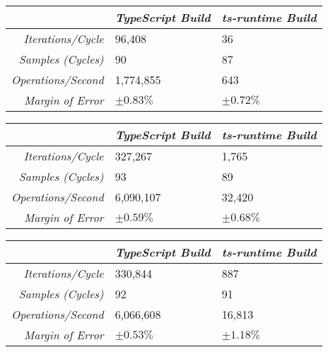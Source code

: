 \begin{center}
{
\centering
\tabulinesep=1.2mm
\setlength{\tabcolsep}{5mm}
\def\arraystretch{1.25}
\small
\begin{tabu} to \textwidth {|r||X[c,m]|X[c,m]|}
  \hline
  & \emph{TypeScript Build} & \emph{ts-runtime Build} \\
  \hline
  \hline
  \emph{Iterations/Cycle}  & 96,408 & 36 \\
  \hline
  \emph{Samples (Cycles)}  & 90 & 87 \\
  \hline
  \emph{Operations/Second} & 1,774,855 & 643 \\
  \hline
  \emph{Margin of Error}   & $\pm 0.83\%$ & $\pm 0.72\%$ \\
  \hline
\end{tabu}
}
\end{center}

\begin{center}
{
\centering
\tabulinesep=1.2mm
\setlength{\tabcolsep}{5mm}
\def\arraystretch{1.25}
\small
\begin{tabu} to \textwidth {|r||X[c,m]|X[c,m]|}
  \hline
  & \emph{TypeScript Build} & \emph{ts-runtime Build} \\
  \hline
  \hline
  \emph{Iterations/Cycle}  & 327,267 & 1,765 \\
  \hline
  \emph{Samples (Cycles)}  & 93 & 89 \\
  \hline
  \emph{Operations/Second} & 6,090,107 & 32,420 \\
  \hline
  \emph{Margin of Error}   & $\pm 0.59\%$ & $\pm 0.68\%$ \\
  \hline
\end{tabu}
}
\end{center}

\begin{center}
{
\centering
\tabulinesep=1.2mm
\setlength{\tabcolsep}{5mm}
\def\arraystretch{1.25}
\small
\begin{tabu} to \textwidth {|r||X[c,m]|X[c,m]|}
  \hline
  & \emph{TypeScript Build} & \emph{ts-runtime Build} \\
  \hline
  \hline
  \emph{Iterations/Cycle}  & 330,844 & 887 \\
  \hline
  \emph{Samples (Cycles)}  & 92 & 91 \\
  \hline
  \emph{Operations/Second} & 6,066,608 & 16,813 \\
  \hline
  \emph{Margin of Error}   & $\pm 0.53\%$ & $\pm 1.18\%$ \\
  \hline
\end{tabu}
}
\end{center}

